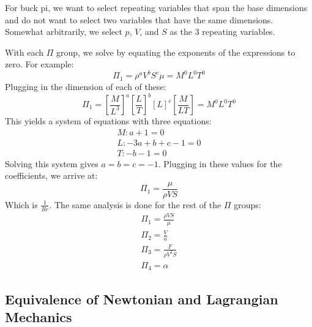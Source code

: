 \documentclass[12pt]{report}
\begin{document}
For \gls{buck pi}, we want to select repeating variables that span the base dimensions and do not want to select two variables that have the same dimensions. Somewhat arbitrarily, we select $p$, $V$, and $S$ as the 3 repeating variables.

With each $\Pi$ group, we solve by equating the exponents of the expressions to zero. For example:
$$\Pi_1=\rho^aV^bS^c\mu=M^0L^0T^0$$
Plugging in the dimension of each of these:
$$\Pi_1=\left[\frac{M}{L^3}\right]^a\left[\frac{L}{T}\right]^b[L]^c\left[\frac{M}{LT}\right]=M^0L^0T^0$$
This yields a system of equations with three equations:
\begin{gather}
    M:a+1=0\\L:-3a+b+c-1=0\\T:-b-1=0
\end{gather}
Solving this system gives $a=b=c=-1$. Plugging in these values for the coefficients, we arrive at:
$$\Pi_1=\frac{\mu}{\rho VS}$$
Which is $\frac{1}{Re}$.  The same analysis is done for the rest of the $\Pi$ groups:
\begin{gather}
    \Pi_1=\frac{\rho VS}{\mu}\\
    \Pi_2=\frac{V}{a}\\
    \Pi_3=\frac{F}{\rho V^2S}\\
    \Pi_4=\alpha
\end{gather}
\subsection{Equivalence of Newtonian and Lagrangian Mechanics}\label{equiv newt and lang}
\end{document}

